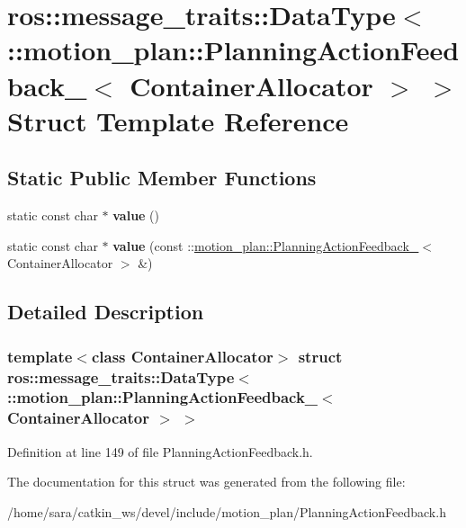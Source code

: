 \hypertarget{structros_1_1message__traits_1_1DataType_3_01_1_1motion__plan_1_1PlanningActionFeedback___3_01ContainerAllocator_01_4_01_4}{}\section{ros\+:\+:message\+\_\+traits\+:\+:Data\+Type$<$ \+:\+:motion\+\_\+plan\+:\+:Planning\+Action\+Feedback\+\_\+$<$ Container\+Allocator $>$ $>$ Struct Template Reference}
\label{structros_1_1message__traits_1_1DataType_3_01_1_1motion__plan_1_1PlanningActionFeedback___3_01ContainerAllocator_01_4_01_4}
\subsection*{Static Public Member Functions}
\begin{DoxyCompactItemize}
\item 
\mbox{\label{structros_1_1message__traits_1_1DataType_3_01_1_1motion__plan_1_1PlanningActionFeedback___3_01ContainerAllocator_01_4_01_4_a86aae61de1e3b2bff77665b0f8a5b498}} 
static const char $\ast$ {\bfseries value} ()
\item 
\mbox{\label{structros_1_1message__traits_1_1DataType_3_01_1_1motion__plan_1_1PlanningActionFeedback___3_01ContainerAllocator_01_4_01_4_a5dc2b97524ff05d3c225777b66fef04b}} 
static const char $\ast$ {\bfseries value} (const \+::\hyperlink{structmotion__plan_1_1PlanningActionFeedback__}{motion\+\_\+plan\+::\+Planning\+Action\+Feedback\+\_\+}$<$ Container\+Allocator $>$ \&)
\end{DoxyCompactItemize}


\subsection{Detailed Description}
\subsubsection*{template$<$class Container\+Allocator$>$\newline
struct ros\+::message\+\_\+traits\+::\+Data\+Type$<$ \+::motion\+\_\+plan\+::\+Planning\+Action\+Feedback\+\_\+$<$ Container\+Allocator $>$ $>$}



Definition at line 149 of file Planning\+Action\+Feedback.\+h.



The documentation for this struct was generated from the following file\+:\begin{DoxyCompactItemize}
\item 
/home/sara/catkin\+\_\+ws/devel/include/motion\+\_\+plan/Planning\+Action\+Feedback.\+h\end{DoxyCompactItemize}
